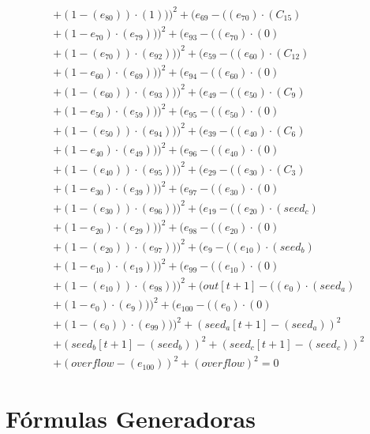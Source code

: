 \documentclass[10pt, a4paper]{article}
\begin{document}
\begin{align*}
& + (1 - (e_{80})) \cdot (1)))^{2} + (e_{69} - ((e_{70})  \cdot  (C_{15}) \\
& + (1 - e_{70})  \cdot  (e_{79})))^{2} + (e_{93} - ((e_{70}) \cdot (0) \\
& + (1 - (e_{70})) \cdot (e_{92})))^{2} + (e_{59} - ((e_{60})  \cdot  (C_{12}) \\
& + (1 - e_{60})  \cdot  (e_{69})))^{2} + (e_{94} - ((e_{60}) \cdot (0) \\
& + (1 - (e_{60})) \cdot (e_{93})))^{2} + (e_{49} - ((e_{50})  \cdot  (C_{9}) \\
& + (1 - e_{50})  \cdot  (e_{59})))^{2} + (e_{95} - ((e_{50}) \cdot (0) \\
& + (1 - (e_{50})) \cdot (e_{94})))^{2} + (e_{39} - ((e_{40})  \cdot  (C_{6}) \\
& + (1 - e_{40})  \cdot  (e_{49})))^{2} + (e_{96} - ((e_{40}) \cdot (0) \\
& + (1 - (e_{40})) \cdot (e_{95})))^{2} + (e_{29} - ((e_{30})  \cdot  (C_{3}) \\
& + (1 - e_{30})  \cdot  (e_{39})))^{2} + (e_{97} - ((e_{30}) \cdot (0) \\
& + (1 - (e_{30})) \cdot (e_{96})))^{2} + (e_{19} - ((e_{20})  \cdot  (seed_c) \\
& + (1 - e_{20})  \cdot  (e_{29})))^{2} + (e_{98} - ((e_{20}) \cdot (0) \\
& + (1 - (e_{20})) \cdot (e_{97})))^{2} + (e_{9} - ((e_{10})  \cdot  (seed_b) \\
& + (1 - e_{10})  \cdot  (e_{19})))^{2} + (e_{99} - ((e_{10}) \cdot (0) \\
& + (1 - (e_{10})) \cdot (e_{98})))^{2} + (out[t+1] - ((e_{0})  \cdot  (seed_a) \\
& + (1 - e_{0})  \cdot  (e_{9})))^{2} + (e_{100} - ((e_{0}) \cdot (0) \\
& + (1 - (e_{0})) \cdot (e_{99})))^{2} + (seed_a[t+1] - (seed_a))^{2} \\
& + (seed_b[t+1] - (seed_b))^{2} + (seed_c[t+1] - (seed_c))^{2} \\
& + (overflow - (e_{100}))^{2} + (overflow)^{2} = 0
\end{align*}\part{Fórmulas Generadoras}
\end{document}
